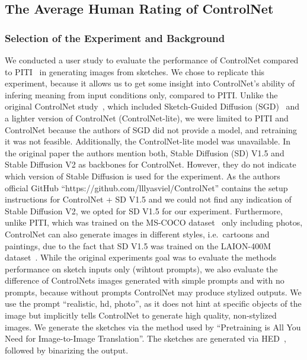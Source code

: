 \subsection{The Average Human Rating of ControlNet}
\subsubsection{Selection of the Experiment and Background}
We conducted a user study to evaluate the performance of ControlNet compared to PITI~\cite{wang2022pretrainingneedimagetoimagetranslation} in generating images from sketches. We chose to replicate this experiment, because it allows us to get some insight into ControlNet's ability of infering meaning from input conditions only, compared to PITI.
Unlike the original ControlNet study~\cite{zhang2023addingconditionalcontroltexttoimage}, which included Sketch-Guided Diffusion (SGD)~\cite{voynov2022sketchguidedtexttoimagediffusionmodels} and a lighter version of ControlNet (ControlNet-lite), we were limited to PITI and ControlNet because the authors of SGD did not provide a model, and retraining it was not feasible. Additionally, the ControlNet-lite model was unavailable. In the original paper the authors mention both, Stable Diffusion (SD) V1.5 and Stable Diffusion V2 as backbones for ControlNet. However, they do not indicate which version of Stable Diffusion is used for the experiment. As the authors official GitHub ``https://github.com/lllyasviel/ControlNet'' contains the setup instructions for ControlNet + SD V1.5 and we could not find any indication of Stable Diffusion V2, we opted for SD V1.5 for our experiment. Furthermore, unlike PITI, which was trained on the MS-COCO dataset~\cite{lin2015microsoftcococommonobjects} only including photos, ControlNet can also generate images in different styles, i.e.\ cartoons and paintings, due to the fact that SD V1.5 was trained on the LAION-400M dataset~\cite{schuhmann2021laion400mopendatasetclipfiltered}. While the original experiments goal was to evaluate the methods performance on sketch inputs only (wihtout prompts), we also evaluate the difference of ControlNets images generated with simple prompts and with no prompts, because without prompts ControlNet may produce stylized outputs. We use the prompt ``realistic, hd, photo'', as it does not hint at specific objects of the image but implicitly tells ControlNet to generate high quality, non-stylized images. We generate the sketches via the method used by ``Pretraining is All You Need for Image-to-Image
Translation''. The sketches are generated via HED~\cite{xie2015holisticallynestededgedetection}, followed by binarizing the output.


